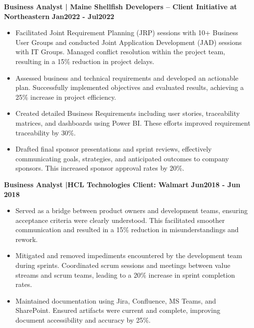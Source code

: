 \documentclass{article}
\begin{document}
\noindent \textbf{Business Analyst | Maine Shellfish Developers – Client Initiative at Northeastern}  \hfill \textbf{Jan2022 - Jul2022}
\begin{itemize}[noitemsep,nolistsep,leftmargin=*]
\item {\small Facilitated Joint Requirement Planning (JRP) sessions with 10+ Business User Groups and conducted Joint Application Development (JAD) sessions with IT Groups. Managed conflict resolution within the project team, resulting in a 15\% reduction in project delays.}
\item {\small Assessed business and technical requirements and developed an actionable plan. Successfully implemented objectives and evaluated results, achieving a 25\% increase in project efficiency.}
\item {\small Created detailed Business Requirements including user stories, traceability matrices, and dashboards using Power BI. These efforts improved requirement traceability by 30\%.}
\item {\small Drafted final sponsor presentations and sprint reviews, effectively communicating goals, strategies, and anticipated outcomes to company sponsors. This increased sponsor approval rates by 20\%.}
\end{itemize}
\vspace{1mm}

\noindent \textbf{Business Analyst |HCL Technologies Client: Walmart}  \hfill \textbf{Jun2018 - Jun 2018}
\begin{itemize}[noitemsep,nolistsep,leftmargin=*]
\item {\small Served as a bridge between product owners and development teams, ensuring acceptance criteria were clearly understood. This facilitated smoother communication and resulted in a 15\% reduction in misunderstandings and rework.}
\item {\small Mitigated and removed impediments encountered by the development team during sprints. Coordinated scrum sessions and meetings between value streams and scrum teams, leading to a 20\% increase in sprint completion rates.}
\item {\small Maintained documentation using Jira, Confluence, MS Teams, and SharePoint. Ensured artifacts were current and complete, improving document accessibility and accuracy by 25\%.}
\end{itemize}
\vspace{1mm}
\end{document}
